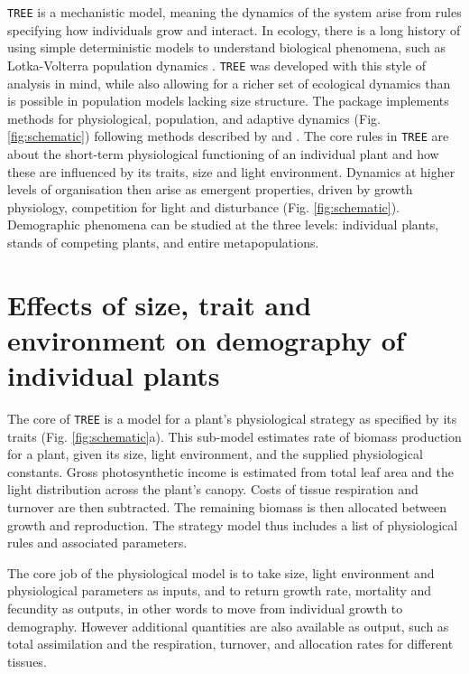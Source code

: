 \documentclass[a4paper,11pt]{article}
\begin{document}
\texttt{TREE} is a mechanistic model, meaning the dynamics of the system arise
from rules specifying how individuals grow and interact. In ecology,
there is a long history of using simple deterministic models
to understand biological phenomena, such as Lotka-Volterra population dynamics
\citep{MacArthur-1967, Leimar-2013} .
\texttt{TREE} was developed with this style of analysis in mind, while also
allowing for a richer set of ecological dynamics than is possible in
population models lacking size structure. The package implements methods
for physiological, population, and adaptive dynamics (Fig.
\ref{fig:schematic}) following methods described by \citet{Falster-2011}
and \citet{Falster-2015}. The core rules in \texttt{TREE} are about the
short-term physiological functioning of an individual plant and how
these are influenced by its traits, size and light environment. Dynamics
at higher levels of organisation then arise as emergent properties,
driven by growth physiology, competition for light and disturbance (Fig.
\ref{fig:schematic}). Demographic phenomena can be studied at the three
levels: individual plants, stands of competing plants, and entire
metapopulations.

\section{Effects of size, trait and environment on demography of individual plants}

The core of \texttt{TREE} is a model for a plant's physiological strategy as
specified by its traits (Fig. \ref{fig:schematic}a). This sub-model
estimates rate of biomass production for a plant, given its size, light
environment, and the supplied physiological constants. Gross photosynthetic 
income is
estimated from total leaf area and the light distribution across the
plant's canopy. Costs of tissue respiration and turnover are then
subtracted. The remaining biomass is then allocated between growth and
reproduction. The strategy model thus includes a list of physiological
rules and associated parameters.

The core job of the physiological model is to take size, light
environment and physiological parameters as inputs, and to return growth rate,
mortality and fecundity as outputs, in other words to move from
individual growth to demography. However additional quantities are also
available as output, such as total assimilation and the respiration,
turnover, and allocation rates for different tissues.
\end{document}

